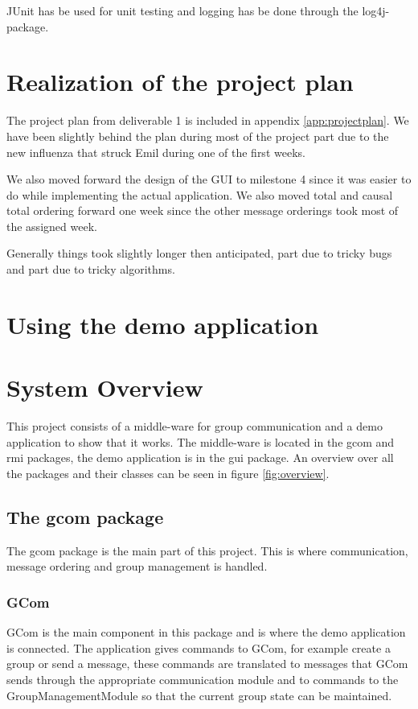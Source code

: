 \documentclass[english]{article}
\begin{document}
JUnit has be used for unit testing and logging has be done through the log4j-package. 

\section{Realization of the project plan}
The project plan from deliverable 1 is included in appendix \vref{app:projectplan}. We have been slightly behind the plan during most of the project part due to the new influenza that struck Emil during one of the first weeks.

We also moved forward the design of the GUI to milestone 4 since it was easier to do while implementing the actual application. We also moved total and causal total ordering forward one week since the other message orderings took most of the assigned week. 

Generally things took slightly longer then anticipated, part due to tricky bugs and part due to tricky algorithms. 

\section{Using the demo application}


\section{System Overview}
This project consists of a middle-ware for group communication and a demo application to show that it works. The middle-ware is located in the gcom and rmi packages, the demo application is in the gui package. An overview over all the packages and their classes can be seen in figure \vref{fig:overview}.

\subsection{The gcom package}
The gcom package is the main part of this project. This is where communication, message ordering and group management is handled. 

\subsubsection{GCom}
GCom is the main component in this package and is where the demo application is connected. The application gives commands to GCom, for example create a group or send a message, these commands are translated to messages that GCom sends through the appropriate communication module and to commands to the GroupManagementModule so that the current group state can be maintained.
\end{document}
